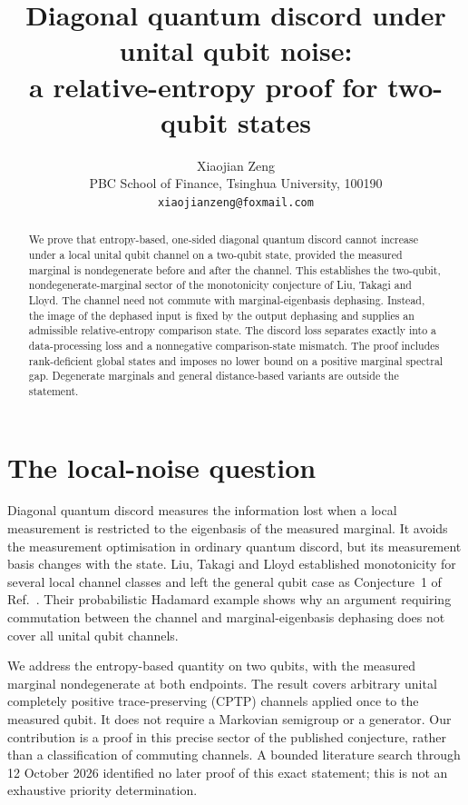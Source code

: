 \documentclass[12pt]{article}
\title{Diagonal quantum discord under unital qubit noise:\\a relative-entropy proof for two-qubit states}
\author{Xiaojian Zeng\\\small PBC School of Finance, Tsinghua University, 100190\\\small\texttt{xiaojianzeng@foxmail.com}}
\date{}
\begin{document}
\maketitle
\begin{abstract}
We prove that entropy-based, one-sided diagonal quantum discord cannot increase under a local unital qubit channel on a two-qubit state, provided the measured marginal is nondegenerate before and after the channel. This establishes the two-qubit, nondegenerate-marginal sector of the monotonicity conjecture of Liu, Takagi and Lloyd. The channel need not commute with marginal-eigenbasis dephasing. Instead, the image of the dephased input is fixed by the output dephasing and supplies an admissible relative-entropy comparison state. The discord loss separates exactly into a data-processing loss and a nonnegative comparison-state mismatch. The proof includes rank-deficient global states and imposes no lower bound on a positive marginal spectral gap. Degenerate marginals and general distance-based variants are outside the statement.
\end{abstract}

\section{The local-noise question}
Diagonal quantum discord measures the information lost when a local measurement is restricted to the eigenbasis of the measured marginal. It avoids the measurement optimisation in ordinary quantum discord, but its measurement basis changes with the state. Liu, Takagi and Lloyd established monotonicity for several local channel classes and left the general qubit case as Conjecture~1 of Ref.~\cite{Liu2019}. Their probabilistic Hadamard example shows why an argument requiring commutation between the channel and marginal-eigenbasis dephasing does not cover all unital qubit channels.

We address the entropy-based quantity on two qubits, with the measured marginal nondegenerate at both endpoints. The result covers arbitrary unital completely positive trace-preserving (CPTP) channels applied once to the measured qubit. It does not require a Markovian semigroup or a generator. Our contribution is a proof in this precise sector of the published conjecture, rather than a classification of commuting channels. A bounded literature search through 12 October 2026 identified no later proof of this exact statement; this is not an exhaustive priority determination.
\end{document}
